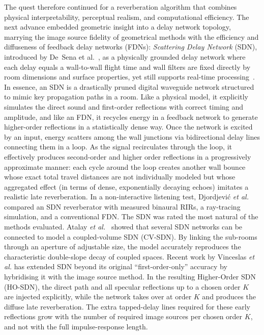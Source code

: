 \documentclass[journal]{IEEEtran}
\begin{document}
The quest therefore continued for a reverberation algorithm that combines physical interpretability, perceptual realism, and computational efficiency. The next advance embedded geometric insight into a delay network topology, marrying the image source fidelity of geometrical methods with the efficiency and diffuseness of feedback delay networks (FDNs): \emph{Scattering Delay Network} (SDN), introduced by De~Sena et al.~\cite{SDNaes}, as a physically grounded delay network where each delay equals a wall-to-wall flight time and wall filters are fixed directly by room dimensions and surface properties, yet still supports real-time processing~\cite{SDNjournal}. In essence, an SDN is a drastically pruned digital waveguide network structured to mimic key propagation paths in a room. Like a physical model, it explicitly simulates the direct sound and first-order reflections with correct
timing and amplitude, and like an FDN, it recycles energy in a feedback network to generate higher-order
reflections in a statistically dense way. Once the network is excited by an input, energy
scatters among the wall junctions via bidirectional delay lines connecting them in a loop. As the signal recirculates through the loop, it effectively produces second-order and higher order
reflections in a progressively approximate manner: each cycle around the loop creates another wall bounce whose exact total travel distances are not individually modeled but whose aggregated
effect (in terms of dense, exponentially decaying echoes) imitates a realistic late reverberation. In a non-interactive listening test, Djordjević \textit{et al.}~\cite{Djordjevic2020} compared an SDN reverberator with measured binaural RIRs, a ray-tracing simulation, and a conventional FDN. 
The SDN was rated the most natural of the methods evaluated. Atalay \textit{et al.}~\cite{timu} showed that several SDN networks can be connected to model a coupled-volume SDN (CV-SDN). By linking the sub-rooms through an aperture of adjustable size, the model accurately reproduces the characteristic double-slope decay of coupled spaces. Recent work by Vinceslas \textit{et al.} has extended SDN beyond its original “first-order-only” accuracy by hybridising it with the image source method. 
In the resulting Higher-Order SDN (HO-SDN), the direct path and all specular reflections up to a chosen order $K$ are injected explicitly, while the network takes over at order $K$ and produces the diffuse late reverberation. 
The extra tapped-delay lines required for these early reflections grow with the number of required image sources per chosen order $K$, and not with the full impulse-response length. 
\end{document}
